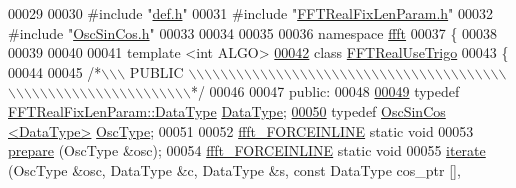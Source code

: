 \begin{DoxyCode}
00029 
00030 \textcolor{preprocessor}{#include    "\hyperlink{a00089}{def.h}"}
00031 \textcolor{preprocessor}{#include    "\hyperlink{a00099}{FFTRealFixLenParam.h}"}
00032 \textcolor{preprocessor}{#include    "\hyperlink{a00111}{OscSinCos.h}"}
00033 
00034 
00035 
00036 \textcolor{keyword}{namespace }\hyperlink{a00142}{ffft}
00037 \{
00038 
00039 
00040 
00041 \textcolor{keyword}{template} <\textcolor{keywordtype}{int} ALGO>
\hypertarget{a00106_source_l00042}{}\hyperlink{a00016}{00042} \textcolor{keyword}{class }\hyperlink{a00016}{FFTRealUseTrigo}
00043 \{
00044 
00045 \textcolor{comment}{/*\(\backslash\)\(\backslash\)\(\backslash\) PUBLIC \(\backslash\)\(\backslash\)\(\backslash\)\(\backslash\)\(\backslash\)\(\backslash\)\(\backslash\)\(\backslash\)\(\backslash\)\(\backslash\)\(\backslash\)\(\backslash\)\(\backslash\)\(\backslash\)\(\backslash\)\(\backslash\)\(\backslash\)\(\backslash\)\(\backslash\)\(\backslash\)\(\backslash\)\(\backslash\)\(\backslash\)\(\backslash\)\(\backslash\)\(\backslash\)\(\backslash\)\(\backslash\)\(\backslash\)\(\backslash\)\(\backslash\)\(\backslash\)\(\backslash\)\(\backslash\)\(\backslash\)\(\backslash\)\(\backslash\)\(\backslash\)\(\backslash\)\(\backslash\)\(\backslash\)\(\backslash\)\(\backslash\)\(\backslash\)\(\backslash\)\(\backslash\)\(\backslash\)\(\backslash\)\(\backslash\)\(\backslash\)\(\backslash\)\(\backslash\)\(\backslash\)\(\backslash\)\(\backslash\)\(\backslash\)\(\backslash\)\(\backslash\)\(\backslash\)\(\backslash\)\(\backslash\)\(\backslash\)\(\backslash\)*/}
00046 
00047 \textcolor{keyword}{public}:
00048 
\hypertarget{a00106_source_l00049}{}\hyperlink{a00016_a2a3c2e9635f2b74cd98df7923ebf0850}{00049}    \textcolor{keyword}{typedef}  \hyperlink{a00012_a119afb4512058be9d19dc6069cb3c19b}{FFTRealFixLenParam::DataType}    \hyperlink{a00016_a2a3c2e9635f2b74cd98df7923ebf0850}{DataType};
\hypertarget{a00106_source_l00050}{}\hyperlink{a00016_a0f3f99dadd857a86b939deebbf57162f}{00050}     \textcolor{keyword}{typedef} \hyperlink{a00020}{OscSinCos <DataType>}    \hyperlink{a00016_a0f3f99dadd857a86b939deebbf57162f}{OscType};
00051 
00052     \hyperlink{a00089_a31b2ada863c9efa7455efae4e13661f3}{ffft\_FORCEINLINE} \textcolor{keyword}{static} \textcolor{keywordtype}{void}
00053                         \hyperlink{a00016_a302dedbe349e8d17efd561a8f59ab69d}{prepare} (OscType &osc);
00054     \hyperlink{a00089_a31b2ada863c9efa7455efae4e13661f3}{ffft\_FORCEINLINE}    \textcolor{keyword}{static} \textcolor{keywordtype}{void}
00055                         \hyperlink{a00016_aaf6165f8f57b4620860a5f427fbdf38e}{iterate} (OscType &osc, DataType &c, DataType &s, \textcolor{keyword}{const} DataType cos\_ptr [], \textcolor{keywordtype}{
}
\end{DoxyCode}
